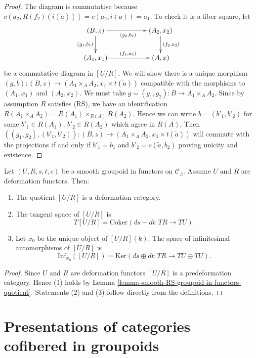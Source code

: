 \begin{proof}
\medskip \noindent
The diagram is commutative because
$c(a_2,R(f_2)(i(\widetilde{a}))) = c(a_2, i(a)) = a_1$.
To check it is a fiber square, let
$$
\xymatrix{
(B, z) \ar[d]_{(g_1, b_1)} \ar[rr]_{(g_2, b_2)} & & (A_2, x_2) 
\ar[d]^{(f_2,a_2)} \\
(A_1, x_1) \ar[rr]^{(f_1,a_1)} && (A,x) 
}
$$
be a commutative diagram in $[U/R]$. We will show there is a unique morphism
$(g, b) : (B, z) \to (A_1 \times_A A_2, x_1 \times t(\widetilde{a}))$
compatible with the morphisms to $(A_1, x_1)$ and $(A_2, x_2)$.
We must take $g = (g_1, g_2) : B \to A_1 \times_{A} A_2$.
Since by assumption $R$ satisfies (RS), we have an identification
$R(A_1 \times_{A} A_2) = R(A_1) \times_{R(A)} R(A_2)$.
Hence we can write $b = (b'_1, b'_2)$ for some
$b'_1 \in R(A_1)$, $b'_2 \in R(A_2)$ which agree in $R(A)$.
Then
$((g_1, g_2), (b'_1, b'_2)) : (B, z) \to
(A_1 \times_A A_2, x_1 \times t(\widetilde{a}))$
will commute with the projections if and only if
$b'_1 = b_1$ and $b'_2 = c(\widetilde{a}, b_2)$ proving unicity and
existence.
\end{proof}

\begin{lemma}
\label{lemma-deformation-groupoid-quotient}
Let $(U, R, s,t,c)$ be a smooth groupoid in functors on $\mathcal{C}_\Lambda$. 
Assume $U$ and $R$ are deformation functors. Then:
\begin{enumerate}
\item The quotient $[U/R]$ is a deformation category.
\item The tangent space of $[U/R]$ is 
$$
T[U/R] = \text{Coker}(ds-dt: TR \to TU).
$$
\item Let $x_0$ be the unique object of $[U/R](k)$.  The space of infinitesimal 
automorphisms of $[U/R]$ is 
$$
\text{Inf}_{x_0}([U/R]) =
\text{Ker}(ds \oplus dt : TR \to TU \oplus TU).  
$$
\end{enumerate}
\end{lemma}

\begin{proof}
Since $U$ and $R$ are deformation functors $[U/R]$ is a predeformation 
category. Hence (1) holds by Lemma 
\ref{lemma-smooth-RS-groupoid-in-functors-quotient}.  Statements (2) and (3) 
follow directly from the definitions.
\end{proof}







\section{Presentations of categories cofibered in groupoids}
\label{section-presentation-categories-cofibred-in-groupoids}

